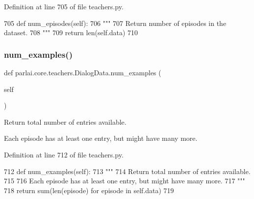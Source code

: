 Definition at line 705 of file teachers.\+py.


\begin{DoxyCode}
705     \textcolor{keyword}{def }num\_episodes(self):
706         \textcolor{stringliteral}{"""}
707 \textcolor{stringliteral}{        Return number of episodes in the dataset.}
708 \textcolor{stringliteral}{        """}
709         \textcolor{keywordflow}{return} len(self.data)
710 
\end{DoxyCode}
\mbox{\label{classparlai_1_1core_1_1teachers_1_1DialogData_a8deee9e9e45ae8162270bdcdfd7916b6}} 
\subsubsection{\texorpdfstring{num\+\_\+examples()}{num\_examples()}}
{\footnotesize\ttfamily def parlai.\+core.\+teachers.\+Dialog\+Data.\+num\+\_\+examples (\begin{DoxyParamCaption}\item[{}]{self }\end{DoxyParamCaption})}

\begin{DoxyVerb}Return total number of entries available.

Each episode has at least one entry, but might have many more.
\end{DoxyVerb}
 

Definition at line 712 of file teachers.\+py.


\begin{DoxyCode}
712     \textcolor{keyword}{def }num\_examples(self):
713         \textcolor{stringliteral}{"""}
714 \textcolor{stringliteral}{        Return total number of entries available.}
715 \textcolor{stringliteral}{}
716 \textcolor{stringliteral}{        Each episode has at least one entry, but might have many more.}
717 \textcolor{stringliteral}{        """}
718         \textcolor{keywordflow}{return} sum(len(episode) \textcolor{keywordflow}{for} episode \textcolor{keywordflow}{in} self.data)
719 
\end{DoxyCode}
\mbox{\label{classparlai_1_1core_1_1teachers_1_1DialogData_ada6f4dc4e2a8a84fba5f1e54d214d15e}} 
